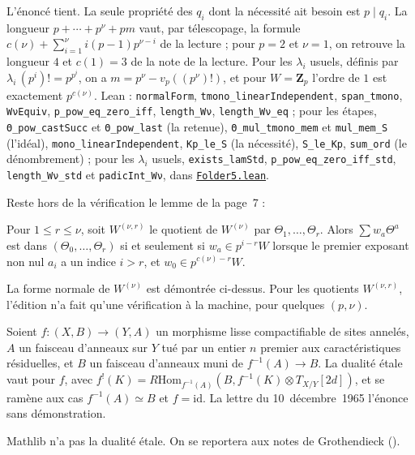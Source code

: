\noindent L'énoncé tient. La seule propriété des $q_i$ dont la nécessité ait besoin est $p \mid q_i$. La longueur $p + \cdots + p^\nu + pm$ vaut, par télescopage, la formule $c(\nu) + \sum_{i=1}^{\nu} i(p-1)p^{\nu-i}$ de la lecture ; pour $p = 2$ et $\nu = 1$, on retrouve la longueur $4$ et $c(1) = 3$ de la note de la lecture. Pour les $\lambda_i$ usuels, définis par $\lambda_i\,(p^i)! = p^{p^i}$, on a $m = p^\nu - v_p((p^\nu)!)$, et pour $W = \mathbf Z_p$ l'ordre de $1$ est exactement $p^{c(\nu)}$. Lean : \texttt{normalForm}, \texttt{tmono\_linearIndependent}, \texttt{span\_tmono}, \texttt{WνEquiv}, \texttt{p\_pow\_eq\_zero\_iff}, \texttt{length\_Wν}, \texttt{length\_Wν\_eq} ; pour les étapes, \texttt{Θ\_pow\_castSucc} et \texttt{Θ\_pow\_last} (la retenue), \texttt{Θ\_mul\_tmono\_mem} et \texttt{mul\_mem\_S} (l'idéal), \texttt{mono\_linearIndependent}, \texttt{Kp\_le\_S} (la nécessité), \texttt{S\_le\_Kp}, \texttt{sum\_ord} (le dénombrement) ; pour les $\lambda_i$ usuels, \texttt{exists\_lamStd}, \texttt{p\_pow\_eq\_zero\_iff\_std}, \texttt{length\_Wν\_std} et \texttt{padicInt\_Wν}, dans \href{\leanblob/RingTheory/Folder5.lean}{\texttt{Folder5.\allowbreak{}lean}}.

Reste hors de la vérification le lemme de la page~7 :

\begin{encadre}
\begin{theoreme*}\nonverifie
Pour $1 \leq r \leq \nu$, soit $W^{(\nu,r)}$ le quotient de $W^{(\nu)}$ par $\Theta_1, \ldots, \Theta_r$. Alors $\sum w_a\Theta^a$ est dans $(\Theta_0, \ldots, \Theta_r)$ si et seulement si $w_a \in p^{i-r}W$ lorsque le premier exposant non nul $a_i$ a un indice $i > r$, et $w_0 \in p^{c(\nu)-r}W$.
\end{theoreme*}
\end{encadre}
{\small La forme normale de $W^{(\nu)}$ est démontrée ci-dessus. Pour les quotients $W^{(\nu,r)}$, l'édition n'a fait qu'une vérification à la machine, pour quelques $(p, \nu)$.\par}

\begin{encadre}
\begin{theoreme*}\nonverifie
Soient $f : (X, B) \to (Y, A)$ un morphisme lisse compactifiable de sites annelés, $A$ un faisceau d'anneaux sur $Y$ tué par un entier $n$ premier aux caractéristiques résiduelles, et $B$ un faisceau d'anneaux muni de $f^{-1}(A) \to B$. La dualité étale vaut pour $f$, avec $f^!(K) = R\mathrm{Hom}_{f^{-1}(A)}(B, f^{-1}(K) \otimes T_{X/Y}[2d])$, et se ramène aux cas $f^{-1}(A) \simeq B$ et $f = \mathrm{id}$. La lettre du 10~décembre~1965 l'énonce sans démonstration.
\end{theoreme*}
\end{encadre}
{\small Mathlib n'a pas la dualité étale. On se reportera aux notes de Grothendieck ().\par}
